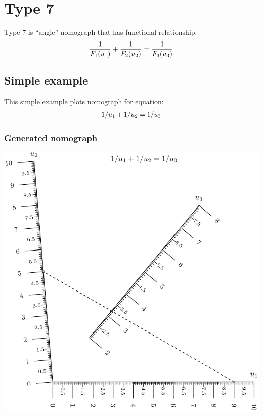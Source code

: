 \documentclass[a4paper,11pt,english]{sphinxmanual}
\begin{document}
\section{Type 7}
\label{types/types:type-7}\label{types/types:type7-ref}
Type 7 is ``angle'' nomograph that has functional relationship:
\begin{gather}
\begin{split}\frac{1}{F_1(u_1)}+\frac{1}{F_2(u_2)}=\frac{1}{F_3(u_3)}\end{split}\notag
\end{gather}

\subsection{Simple example}
\label{types/types:id31}
This simple example plots nomograph for equation:
\begin{gather}
\begin{split}1/ u_1 + 1/u_2 = 1 / u_3\end{split}\notag
\end{gather}

\subsubsection{Generated nomograph}
\label{types/types:id32}
\includegraphics{ex_type7_nomo_1.pdf}
\end{document}
